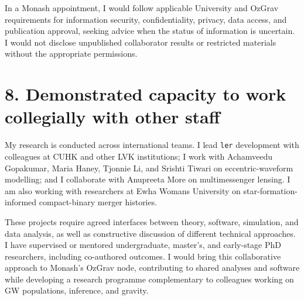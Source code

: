 \documentclass[10pt]{article}
\begin{document}
In a Monash appointment, I would follow applicable University and OzGrav requirements for information security, confidentiality, privacy, data access, and publication approval, seeking advice when the status of information is uncertain. I would not disclose unpublished collaborator results or restricted materials without the appropriate permissions.

\section*{8. Demonstrated capacity to work collegially with other staff}
My research is conducted across international teams. I lead \texttt{ler} development with colleagues at CUHK and other LVK institutions; I work with Achamveedu Gopakumar, Maria Haney, Tjonnie Li, and Srishti Tiwari on eccentric-waveform modelling; and I collaborate with Anupreeta More on multimessenger lensing. I am also working with researchers at Ewha Womans University on star-formation-informed compact-binary merger histories.

These projects require agreed interfaces between theory, software, simulation, and data analysis, as well as constructive discussion of different technical approaches. I have supervised or mentored undergraduate, master's, and early-stage PhD researchers, including co-authored outcomes. I would bring this collaborative approach to Monash's OzGrav node, contributing to shared analyses and software while developing a research programme complementary to colleagues working on GW populations, inference, and gravity.
\end{document}
